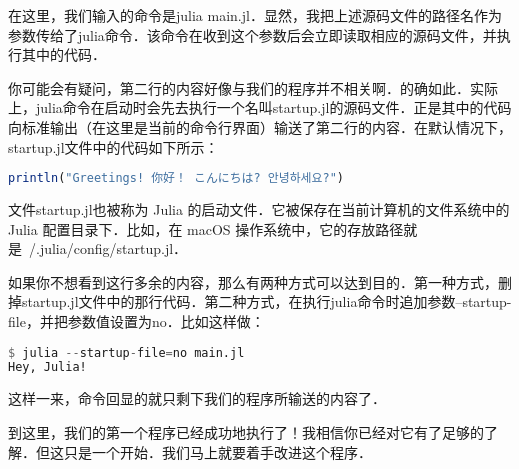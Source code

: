 在这里，我们输入的命令是julia main.jl．显然，我把上述源码文件的路径名作为参数传给了julia命令．该命令在收到这个参数后会立即读取相应的源码文件，并执行其中的代码．

你可能会有疑问，第二行的内容好像与我们的程序并不相关啊．的确如此．实际上，julia命令在启动时会先去执行一个名叫startup.jl的源码文件．正是其中的代码向标准输出（在这里是当前的命令行界面）输送了第二行的内容．在默认情况下，startup.jl文件中的代码如下所示：
\begin{lstlisting}[language=julia]
println("Greetings! 你好！ こんにちは? 안녕하세요?")
\end{lstlisting}

文件startup.jl也被称为 Julia 的启动文件．它被保存在当前计算机的文件系统中的 Julia 配置目录下．比如，在 macOS 操作系统中，它的存放路径就是~/.julia/config/startup.jl．

如果你不想看到这行多余的内容，那么有两种方式可以达到目的．第一种方式，删掉startup.jl文件中的那行代码．第二种方式，在执行julia命令时追加参数--startup-file，并把参数值设置为no．比如这样做：
\begin{lstlisting}[language=julia]
$ julia --startup-file=no main.jl
Hey, Julia!
\end{lstlisting}
这样一来，命令回显的就只剩下我们的程序所输送的内容了．

到这里，我们的第一个程序已经成功地执行了！我相信你已经对它有了足够的了解．但这只是一个开始．我们马上就要着手改进这个程序．
